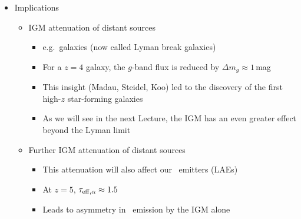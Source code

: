 \documentclass[12pt,letterpaper]{article}
\begin{document}
\begin{Aenumerate}
\begin{itemize}
\begin{itemize}
		\end{itemize}
	\item Implications
		\begin{itemize}
		\item IGM attenuation of distant sources
			\begin{itemize}
			\item e.g.\ galaxies (now called Lyman break galaxies)
			\item For a $z=4$ galaxy, the $g$-band flux is reduced
			by $\Delta m_g \approx 1$\,mag
			\item This insight (Madau, Steidel, Koo) led to the discovery
			of the first high-$z$ star-forming galaxies 
			\item As we will see in the next Lecture, the IGM has an even
			greater effect beyond the Lyman limit
			\end{itemize}
		\item Further IGM attenuation of distant sources
			\begin{itemize}
			\item This attenuation will also affect our \lya\ emitters (LAEs)
			\item At $z=5$, $\tau_{\rm eff, \alpha} \approx 1.5$ 
			\item Leads to asymmetry in \lya\ emission by the IGM alone
			\end{itemize}
		\end{itemize}

	\end{itemize}


\end{Aenumerate}
\end{document}
